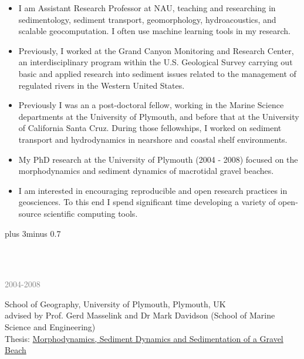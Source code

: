 \documentclass{article} %
\def\bf{\bfseries}
\def\sf{\sffamily}
\def\sl{\slshape}
\newlength\sidebarwidth
\newcommand{\topic}[3][]%
	 {\pagebreak[2]%
	 \vskip 1.5\baselineskip plus 3\baselineskip minus 0.7\baselineskip
	 \begin{minipage}{\textwidth}
         \phantomsection\addcontentsline{toc}{section}{#1}%
         \nopagebreak\hspace{0in}%
         \nopagebreak\begin{minipage}[t]{\sidebarwidth - .2cm}
         \raggedleft \bf\sf
	 \color{deep_blue}{\Large #2}
	 \end{minipage}%
	 \hfill
	 \begin{minipage}[t]{\linewidth - \sidebarwidth}
	 \nopagebreak{\color{deep_blue}%
		    \rule{0pt}{\baselineskip}%
		    \rule{\linewidth}{2.5pt}%
		    \llap{\raisebox{.3\baselineskip}{\sf #1}}%
		    \vspace*{.1\baselineskip}%
		    }%
	 #3%
	 \end{minipage}
	 \end{minipage}}
\newcommand{\subtopic}[3][]
	 {\begin{minipage}{\textwidth}
	 \vspace*{.4\baselineskip}
         \nopagebreak\hspace{0in}%
         \nopagebreak\begin{minipage}[t]{\sidebarwidth - .2cm}
         \raggedleft {\sf\fontseries{sbc}\selectfont #2}
         {\\[-0.2\baselineskip] \textcolor{gray}{\footnotesize #1}}
	 \end{minipage}%
	 \hfill
	 \begin{minipage}[t]{\linewidth - \sidebarwidth}
	 #3%
	 \end{minipage}%
	 \vspace*{.2\baselineskip plus 1\baselineskip minus
	 .2\baselineskip}%
	 \end{minipage}}
\def\mydot{\textcolor{deep_blue}{\rule{1ex}{1ex}}}
\begin{document}
\begin{multicols}{2}
\sloppy


\begin{itemize}[leftmargin=2ex, itemsep=0ex]
\item[\mydot]
I am Assistant Research Professor at NAU, teaching and researching in sedimentology, sediment transport, geomorphology, hydroacoustics, and
scalable geocomputation. I often use machine learning tools in my research.

\item[\mydot]
Previously, I worked at the Grand Canyon Monitoring and Research Center, an
interdisciplinary program within the U.S. Geological Survey carrying out basic and applied research into sediment issues related to the management of regulated rivers in the Western United States.

\item[\mydot]
Previously I was an a post-doctoral fellow,
working in the Marine Science departments
at the University of Plymouth, and before that at the University of California Santa Cruz. During those fellowships, I worked on
sediment transport and hydrodynamics in nearshore and coastal shelf environments.

\item[\mydot]
My PhD research at the University of Plymouth (2004 - 2008) focused on the morphodynamics and sediment dynamics of macrotidal gravel beaches.

\item[\mydot]
I am interested in encouraging reproducible and open research practices
in geosciences.  To this end I spend significant time developing a variety of open-source
scientific computing tools.

\end{itemize}
\end{multicols}
\vspace*{-1.5em}
\fussy

\topic{E \large\hskip -1ex DUCATION}{~}

    \subtopic[2004-2008]{\bf PhD}{
        School of Geography, University of Plymouth, Plymouth, UK\\
        advised by Prof. Gerd Masselink and Dr Mark Davidson (School of Marine Science and Engineering)\\
	Thesis: \href{https://dbuscombe-usgs.github.io/media/pdfs/Buscombe_thesis_june2008.pdf}{
          Morphodynamics, Sediment Dynamics and Sedimentation of a Gravel Beach}
    }
\end{document}

